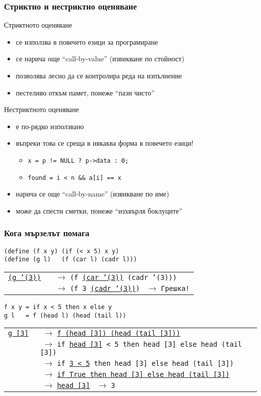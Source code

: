 \documentclass{beamer}
\begin{document}
\begin{frame}
  \frametitle{Стриктно и нестриктно оценяване}
  Стриктното оценяване
  \begin{itemize}[<+->]
  \item се използва в повечето езици за програмиране
  \item се нарича още ``call-by-value'' (извикване по стойност)
  \item позволява лесно да се контролира реда на изпълнение
  \item пестеливо откъм памет, понеже ``пази чисто''
  \end{itemize}
  \onslide<+->
  Нестриктното оценяване
  \begin{itemize}[<+->]
  \item е по-рядко използвано
  \item въпреки това се среща в някаква форма в повечето езици!
    \begin{itemize}
    \item \tt{x = p != NULL ? p->data : 0;}
    \item \tt{found = i < n \&\& a[i] == x}
    \end{itemize}
  \item нарича се още ``call-by-name'' (извикване по име)
  \item може да спести сметки, понеже ``изхвърля боклуците''
  \end{itemize}
\end{frame}

\begin{frame}[fragile]
  \frametitle{Кога мързелът помага}
  \newcommand{\lra}{$\;\rightarrow\;$}
\begin{verbatim}
(define (f x y) (if (< x 5) x y)
(define (g l)   (f (car l) (cadr l)))
\end{verbatim}
\pause
\begin{tabular}[t]{l@{}l}
\tt{\underline{(g '(3))}}
\pause
&\lra \tt{(f \underline{(car '(3))} (cadr '(3)))}\\
\pause
&\lra \tt{(f 3 \underline{(cadr '(3))})}
\pause
\lra \alert{Грешка!}
\end{tabular}
\pause
\begin{verbatim}
f x y = if x < 5 then x else y
g l   = f (head l) (head (tail l))
\end{verbatim}
\pause
\begin{tabular}[t]{l@{}l}
\tt{\underline{g [3]}}
\pause
&\lra \tt{\underline{f (head [3]) (head (tail [3]))}}\\
\pause
&\lra \tt{if \underline{head [3]} < 5 then head [3] else head (tail [3])}\\
\pause
&\lra \tt{if \underline{3 < 5} then head [3] else head (tail [3])}\\
\pause
&\lra \tt{\underline{if True then head [3] else head (tail [3])}}\\
\pause
&\lra \tt{\underline{head [3]}}
\pause
\lra \tt 3
\end{tabular}
\end{frame}
\end{document}
